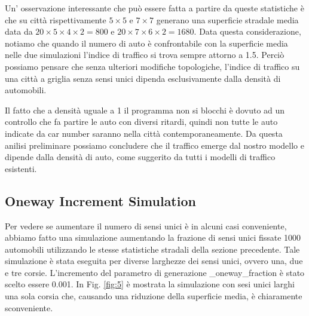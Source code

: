 \documentclass[main.tex]{subfiles}
\begin{document}
        Un' osservazione interessante che può essere fatta a partire da queste statistiche è che su città rispettivamente
        $5 \times 5$ e $7 \times 7$ generano una superficie stradale media data da $20 \times 5 \times 4 \times 2 = 800$ e
        $20 \times 7 \times 6 \times 2 = 1680$. Data questa considerazione, notiamo che quando il numero di auto è confrontabile con 
        la superficie media nelle due simulazioni l'indice di traffico si trova sempre attorno a 1.5.
        Perciò possiamo pensare che senza ulteriori modifiche topologiche, l'indice di traffico su una città a griglia
        senza sensi unici dipenda esclusivamente dalla densità di automobili.

        Il fatto che a densità uguale a 1 il programma non si blocchi è dovuto ad un controllo che fa partire le auto con diversi ritardi,
        quindi non tutte le auto indicate da car number saranno nella città contemporaneamente.
        Da questa anilisi preliminare possiamo concludere che il traffico emerge dal nostro modello e dipende dalla densità di auto,
        come suggerito da tutti i modelli di traffico esistenti.

    \subsection{Oneway Increment Simulation}
        Per vedere se aumentare il numero di sensi unici è in alcuni casi conveniente, abbiamo fatto una simulazione aumentando la frazione di sensi unici 
        fissate 1000 automobili utilizzando le stesse statistiche stradali della sezione precedente. Tale simulazione è stata eseguita per diverse larghezze dei sensi unici, ovvero una, due e tre corsie.
        L'incremento del parametro di generazione \_oneway\_fraction è stato scelto essere 0.001.
        In Fig. \ref{fig:5} è mostrata la simulazione con sesi unici larghi una sola corsia che, causando una riduzione della superficie media, è chiaramente sconveniente.
\end{document}
